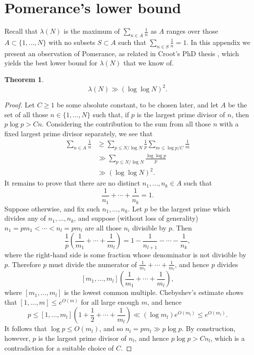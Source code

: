 \documentclass[12pt]{amsart}
\newcommand{\brac}[1]{\left( #1\right)}
\newtheorem{theorem}{Theorem}
\begin{document}
\appendix

\section{Pomerance's lower bound}

Recall that $\lambda(N)$ is the maximum of $\sum_{n\in A}\frac{1}{n}$ as $A$ ranges over those $A\subset \{1,\ldots,N\}$ with no subsets $S\subset A$ such that $\sum_{n\in S}\frac{1}{n}=1$. In this appendix we present an observation of Pomerance, as related in Croot's PhD thesis \cite{Crootphd}, which yields the best lower bound for $\lambda(N)$ that we know of.

\begin{theorem}
\[\lambda(N) \gg (\log\log N)^2.\]
\end{theorem}
\begin{proof}
Let $C\geq 1$ be some absolute constant, to be chosen later, and let $A$ be the set of all those $n\in \{1,\ldots,N\}$ such that, if $p$ is the largest prime divisor of $n$, then $p\log p> Cn$. Considering the contribution to the sum from all those $n$ with a fixed largest prime divisor separately, we see that 
\begin{align*}
\sum_{n\in A}\frac{1}{n}
&\geq \sum_{p\leq N/\log N}\frac{1}{p}\sum_{m\leq \log p/C}\frac{1}{m}\\
&\gg \sum_{p\leq N/\log N}\frac{\log\log p}{p}\\
&\gg (\log\log N)^2.
\end{align*}
It remains to prove that there are no distinct $n_1,\ldots,n_k\in A$ such that 
\[\frac{1}{n_1}+\cdots+\frac{1}{n_k}=1.\]
Suppose otherwise, and fix such $n_1,\ldots,n_k$. Let $p$ be the largest prime which divides any of $n_1,\ldots,n_k$, and suppose (without loss of generality) $n_1=pm_1<\cdots<n_l=pm_l$ are all those $n_i$ divisible by $p$. Then
\[\frac{1}{p}\brac{\frac{1}{m_1}+\cdots+\frac{1}{m_l}}=1-\frac{1}{n_{l+1}}-\cdots-\frac{1}{n_k},\]
where the right-hand side is some fraction whose denominator is not divisible by $p$. Therefore $p$ must divide the numerator of $\frac{1}{m_1}+\cdots+\frac{1}{m_l}$, and hence $p$ divides
\[[m_1,\ldots,m_l]\brac{\frac{1}{m_1}+\cdots+\frac{1}{m_l}},\]
where $[m_1,\ldots,m_l]$ is the lowest common multiple. Chebyshev's estimate shows that $[1,\ldots,m]\leq e^{O(m)}$ for all large enough $m$, and hence
\[p\leq [1,\ldots,m_l]\brac{1+\frac{1}{2}+\cdots+\frac{1}{m_l}}\ll (\log m_l) e^{O(m_l)}\leq e^{O(m_l)}.\]
It follows that $\log p\leq O(m_l)$, and so $n_l=pm_l\gg p\log p$. By construction, however, $p$ is the largest prime divisor of $n_l$, and hence $p\log p>Cn_l$, which is a contradiction for a suitable choice of $C$.
\end{proof}
\end{document}
